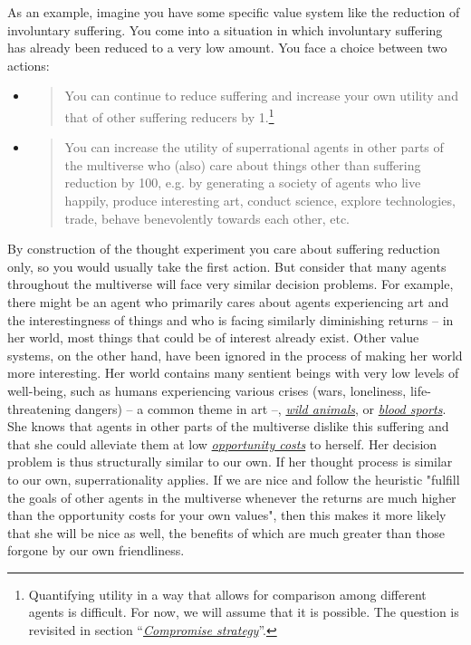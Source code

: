 As an example, imagine you have some specific value system like the
reduction of involuntary suffering. You come into a situation in which
involuntary suffering has already been reduced to a very low amount. You
face a choice between two actions:

\begin{itemize}
\item
  \begin{quote}
  You can continue to reduce suffering and increase your own utility and
  that of other suffering reducers by 1.\footnote{Quantifying utility in
    a way that allows for comparison among different agents is
    difficult. For now, we will assume that it is possible. The question
    is revisited in section
    ``\protect\hyperlink{compromise-strategy}{\emph{Compromise
    strategy}}''.}
  \end{quote}
\item
  \begin{quote}
  You can increase the utility of superrational agents in other parts of
  the multiverse who (also) care about things other than suffering
  reduction by 100, e.g. by generating a society of agents who live
  happily, produce interesting art, conduct science, explore
  technologies, trade, behave benevolently towards each other, etc.
  \end{quote}
\end{itemize}

By construction of the thought experiment you care about suffering
reduction only, so you would usually take the first action. But consider
that many agents throughout the multiverse will face very similar
decision problems. For example, there might be an agent who primarily
cares about agents experiencing art and the interestingness of things
and who is facing similarly diminishing returns -- in her world, most
things that could be of interest already exist. Other value systems, on
the other hand, have been ignored in the process of making her world
more interesting. Her world contains many sentient beings with very low
levels of well-being, such as humans experiencing various crises (wars,
loneliness, life-threatening dangers) -- a common theme in art --,
\href{https://foundational-research.org/the-importance-of-wild-animal-suffering/}{\emph{wild
animals}}, or
\href{https://en.wikipedia.org/wiki/Blood_sport}{\emph{blood sports}}.
She knows that agents in other parts of the multiverse dislike this
suffering and that she could alleviate them at low
\href{https://en.wikipedia.org/wiki/Opportunity_cost}{\emph{opportunity
costs}} to herself. Her decision problem is thus structurally similar to
our own. If her thought process is similar to our own, superrationality
applies. If we are nice and follow the heuristic "fulfill the goals of
other agents in the multiverse whenever the returns are much higher than
the opportunity costs for your own values", then this makes it more
likely that she will be nice as well, the benefits of which are much
greater than those forgone by our own friendliness.

